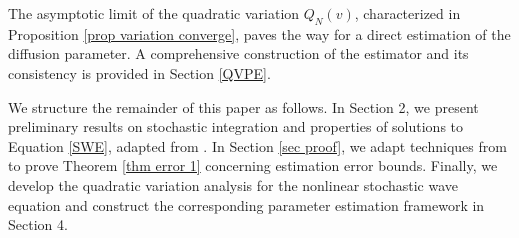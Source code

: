 \documentclass[11pt,reqno]{amsart}
\numberwithin{equation}{section}
\newcommand{\1}{{\bf 1}}
\newcommand{\2}{{\bf 2}}
\begin{document}
    The asymptotic limit of the quadratic variation $Q_N(v)$, characterized in Proposition \ref{prop variation converge}, paves the way for a direct estimation of the diffusion parameter. A comprehensive construction of the estimator   and its consistency is provided in Section \ref{QVPE}.

 
 We structure the remainder of this paper as follows. In Section 2, we present preliminary results on stochastic integration and 
properties of solutions to Equation \eqref{SWE}, adapted from \cite{D99, DQ}. In Section \ref{sec proof}, we   adapt techniques from \cite{HOO2024} to    prove Theorem \ref{thm error 1} concerning estimation error bounds. Finally,  we develop the quadratic variation analysis for the nonlinear stochastic wave equation and construct the corresponding parameter estimation framework in Section 4.
\end{document}
